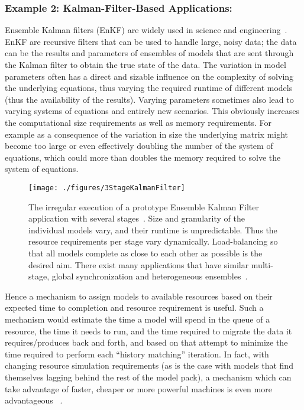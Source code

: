 \documentclass[10pt,letterpaper]{article}
\begin{document}
\subsubsection*{Example 2: Kalman-Filter-Based Applications:} 

Ensemble Kalman filters (EnKF) are widely used in science and
engineering~\cite{DataAssim, KalmanPaper}. EnKF are recursive filters
that can be used to handle large, noisy data; the data can be the
results and parameters of ensembles of models that are sent through
the Kalman filter to obtain the true state of the data. The variation
in model parameters often has a direct and sizable influence on the
complexity of solving the underlying equations, thus varying the
required runtime of different models (thus the availability of the
results).  Varying parameters sometimes also lead to varying systems
of equations and entirely new scenarios. This obviously increases the
computational size requirements as well as memory requirements.  For
example as a consequence of the variation in size the underlying
matrix might become too large or even effectively doubling the number
of the system of equations, which could more than doubles the memory
required to solve the system of equations.

\begin{wrapfigure}{R}{0.6\textwidth}
 \begin{center}
  \vspace*{-2em}
  \texttt{[image: ./figures/3StageKalmanFilter]}
  \caption{\footnotesize The irregular execution  of a prototype
   Ensemble Kalman Filter application with
   several stages~\cite{saga_tg08}. 
   Size and granularity of the
   individual models vary, and their runtime is unpredictable.  Thus the resource
   requirements per stage vary dynamically.
   Load-balancing so that all
  models complete as close to each other as possible is the desired
  aim.  There exist many applications that have similar multi-stage,
  global synchronization and heterogeneous ensembles~\cite{dpa-paper}.}
  \vspace*{-2em}
  \label{fig:irregular_execution}
 \end{center}
\end{wrapfigure}     

Hence a mechanism to assign models to available resources based on
their expected time to completion and resource requirement is useful.
Such a mechanism would estimate the time a model will spend in the
queue of a resource, the time it needs to run, and the time required
to migrate the data it requires/produces back and forth, and based on
that attempt to minimize the time required to perform each ``history
matching'' iteration.  In fact, with changing resource simulation
requirements (as is the case with models that find themselves lagging
behind the rest of the model pack), a mechanism which can take
advantage of faster, cheaper or more powerful machines is even more
advantageous ~\cite{escience07}.
\end{document}
